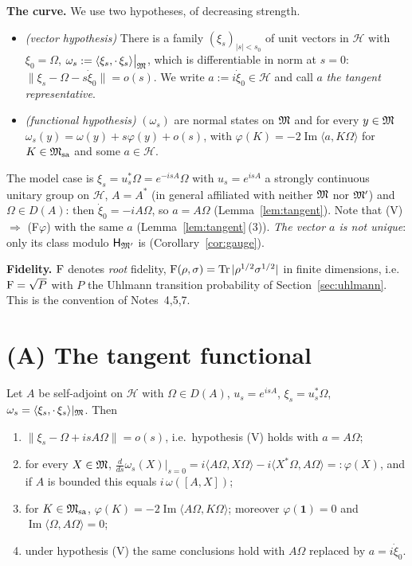 \documentclass[11pt]{article}
\newcommand{\Om}{\Omega}
\newcommand{\Hil}{\mathcal H}
\newcommand{\Msa}{\cM_{\mathrm{sa}}}
\newcommand{\HMp}{\mathsf H_{\cM'}}
\newcommand{\ip}[2]{\langle #1,#2\rangle}
\newcommand{\norm}[1]{\lVert #1\rVert}
\newcommand{\one}{\mathbf 1}
\begin{document}
\textbf{The curve.}  We use two hypotheses, of decreasing strength.
\begin{itemize}[leftmargin=1.5em]
\item[(V)] \emph{(vector hypothesis)} There is a family $(\xi_s)_{|s|<s_0}$ of unit vectors in $\Hil$ with $\xi_0=\Om$,
$\omega_s:=\ip{\xi_s}{\cdot\,\xi_s}\big|_{\cM}$, which is differentiable in norm at $s=0$:
$\norm{\xi_s-\Om-s\dot\xi_0}=o(s)$.  We write $a:=i\dot\xi_0\in\Hil$ and call $a$ \emph{the tangent representative}.
\item[(F$\varphi$)] \emph{(functional hypothesis)} $(\omega_s)$ are normal states on $\mathfrak M$ and for every $y\in\mathfrak M$
$\omega_s(y)=\omega(y)+s\varphi(y)+o(s)$, with $\varphi(K)=-2\operatorname{Im}\ip{a}{K\Om}$ for $K\in\Msa$ and some $a\in\Hil$.
\end{itemize}
The model case is $\xi_s=u_s^*\Om=e^{-isA}\Om$ with $u_s=e^{isA}$ a strongly continuous unitary group on $\Hil$,
$A=A^*$ (in general affiliated with neither $\mathfrak M$ nor $\mathfrak M'$) and $\Om\in D(A)$: then $\dot\xi_0=-iA\Om$, so $a=A\Om$
(Lemma~\ref{lem:tangent}).  Note that (V) $\Rightarrow$ (F$\varphi$) with the same $a$ (Lemma~\ref{lem:tangent}\,(3)).
\emph{The vector $a$ is not unique}: only its class modulo $\HMp$ is (Corollary~\ref{cor:gauge}).

\textbf{Fidelity.}  $\operatorname{F}$ denotes \emph{root} fidelity, $\operatorname{F}(\rho,\sigma)=\operatorname{Tr}|\rho^{1/2}\sigma^{1/2}|$ in finite
dimensions, i.e.\ $\operatorname{F}=\sqrt{P}$ with $P$ the Uhlmann transition probability of Section~\ref{sec:uhlmann}.  This is the
convention of Notes~4,5,7.

\section{(A) The tangent functional}\label{sec:tangent}

\begin{lemma}\label{lem:tangent}
Let $A$ be self-adjoint on $\Hil$ with $\Om\in D(A)$, $u_s=e^{isA}$, $\xi_s=u_s^*\Om$, $\omega_s=\ip{\xi_s}{\cdot\,\xi_s}|_{\cM}$.
Then
\begin{enumerate}[leftmargin=1.7em]
\item $\norm{\xi_s-\Om+isA\Om}=o(s)$, i.e.\ hypothesis \textup{(V)} holds with $a=A\Om$;
\item for every $X\in\mathfrak M$,
 $\displaystyle\frac{d}{ds}\omega_s(X)\Big|_{s=0}=i\ip{A\Om}{X\Om}-i\ip{X^*\Om}{A\Om}=:\varphi(X)$,
 and if $A$ is bounded this equals $i\,\omega([A,X])$;
\item for $K\in\Msa$, $\varphi(K)=-2\operatorname{Im}\ip{A\Om}{K\Om}$; moreover $\varphi(\one)=0$ and
 $\operatorname{Im}\ip{\Om}{A\Om}=0$;
\item under hypothesis \textup{(V)} the same conclusions hold with $A\Om$ replaced by $a=i\dot\xi_0$.
\end{enumerate}
\end{lemma}
\end{document}

